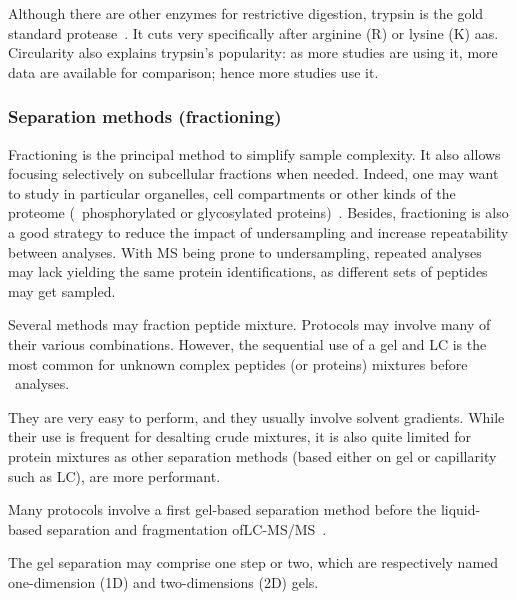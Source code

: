 Although there are other enzymes for restrictive digestion,
trypsin is the gold standard protease~.
It cuts very specifically after arginine (R) or lysine (K) \glspl{aa}.
Circularity also explains trypsin's popularity:
as more studies are using it, more data are available for comparison;
hence more studies use it.\mybr\

\subsubsection{Separation methods (fractioning)}\label{subsub:sepMethods}
Fractioning is the principal method to simplify sample complexity. It also allows
focusing selectively on subcellular fractions when needed. Indeed, one may want
to study in particular organelles, cell compartments or other kinds of the proteome
(\eg\ phosphorylated or glycosylated proteins)~. Besides,
fractioning is also a good strategy to reduce the impact of undersampling and
increase repeatability between analyses.
With \gls{MS} being prone to undersampling,
repeated analyses may lack yielding the same
protein identifications,
as different sets of peptides may get sampled.\mybr\

Several methods may fraction peptide mixture. Protocols may involve many of their
various combinations. However, the sequential use of a gel and \gls{LC} is
the most common for unknown complex peptides (or proteins) mixtures before
\ms\ analyses.\mybr\

They are very easy to perform, and they usually involve solvent gradients. While
their use is frequent for desalting crude mixtures, it is also quite limited
for protein mixtures as other separation methods (based either on gel or
capillarity such as \gls{LC}), are more performant.\mybr\

Many protocols involve a first gel-based separation method before the
liquid-based separation and fragmentation of\enspace\gls{LC-MS/MS}~.\mybr\

The gel separation may comprise one step or two, which are respectively named
one-dimension (1D) and two-dimensions (2D) gels.\mybr\

